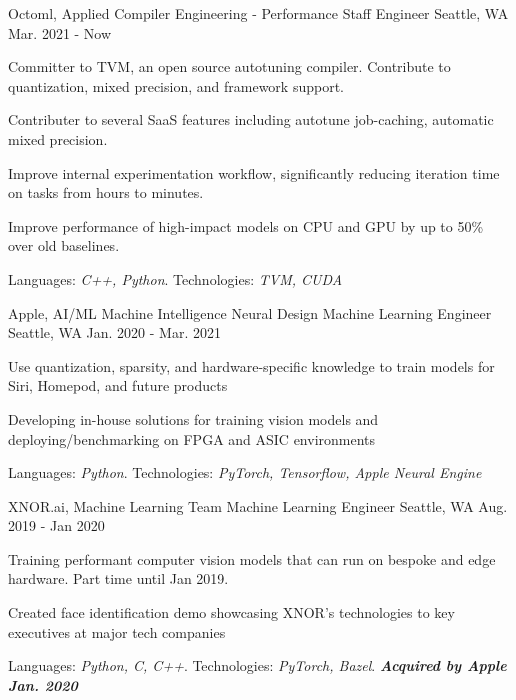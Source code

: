 \begin{cventries}
    \vspace{-0.6em}
  \cventry
    {Octoml, Applied Compiler Engineering - Performance}
    {Staff Engineer}
    {Seattle, WA}
    {Mar. 2021 - Now}
    {
      \begin{cvitems}
        \item {Committer to TVM, an open source autotuning compiler. Contribute to quantization, mixed precision, and framework support.}
        \item {Contributer to several SaaS features including autotune job-caching, automatic mixed precision.}
        \item {Improve internal experimentation workflow, significantly reducing iteration time on tasks from hours to minutes.}
        \item {Improve performance of high-impact models on CPU and GPU by up to 50\% over old baselines.}
        \item {Languages: \textit{C++, Python}. Technologies: \textit{TVM, CUDA}}
	\vspace{-1em}
      \end{cvitems}
    }
   
 
  \cventry
    {Apple, AI/ML Machine Intelligence Neural Design}
    {Machine Learning Engineer}
    {Seattle, WA}
    {Jan. 2020 - Mar. 2021}
    {
      \begin{cvitems}
        \item {Use quantization, sparsity, and hardware-specific knowledge to train models for Siri, Homepod, and future products}
        \item {Developing in-house solutions for training vision models and deploying/benchmarking on FPGA and ASIC environments}
        \item {Languages: \textit{Python}. Technologies: \textit{PyTorch, Tensorflow, Apple Neural Engine}}
	\vspace{-1em}
      \end{cvitems}
    }

  \cventry
    {XNOR.ai, Machine Learning Team}
    {Machine Learning Engineer}
    {Seattle, WA}
    {Aug. 2019 - Jan 2020}
    {
      \begin{cvitems}
        \item {Training performant computer vision models that can run on bespoke and edge hardware. Part time until Jan 2019.}
        \item {Created face identification demo showcasing XNOR's technologies to key executives at major tech companies} 
        \item {Languages: \textit{Python, C, C++}. Technologies: \textit{PyTorch, Bazel}. \textbf{\textit{Acquired by Apple Jan. 2020}}}
	\vspace{-1em}
      \end{cvitems}
    }


\end{cventries}
